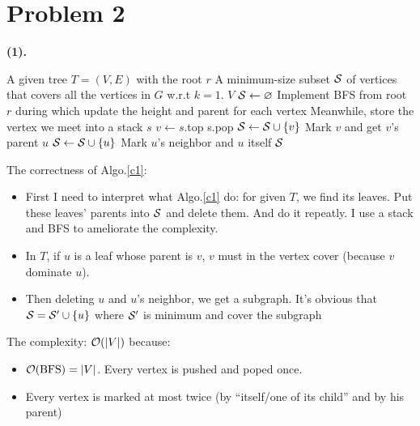 \documentclass{article}
\begin{document}
\section*{Problem 2}
\textbf{(1).}
\begin{algorithm}[H]
	\caption{$\+M(T)$}
	\label{c1}
	\begin{algorithmic}[1]
		\renewcommand{\algorithmicrequire}{\textbf{Input:}}
		\renewcommand{\algorithmicensure}{\textbf{Output:}}
		\renewcommand{\algorithmiccomment}[1]{\hfill\textit{\textcolor{blue}{\##1}}}
		\REQUIRE A given tree $T=(V,E)$ with the root $r$
		\ENSURE A minimum-size subset $\mathcal{S}$ of vertices that covers all the vertices in $G$ w.r.t $k=1$.
		\RETURN $V$
		\ENDIF
		\STATE $\mathcal{S}\gets \varnothing$
		\STATE Implement BFS from root $r$ during which update the height and parent for each vertex
		\STATE Meanwhile, store the vertex we meet into a stack $s$
		\STATE $v\gets s$.top
		\STATE s.pop
		\STATE  $\mathcal{S}\gets\mathcal{S}\cup\{v\}$
		\ENDIF
		\ELSE
		\STATE Mark $v$ and get $v$'s parent $u$
		\STATE $\mathcal{S}\gets\mathcal{S}\cup\{u\}$
		\STATE Mark $u$'s neighbor and $u$ itself
		\ENDIF
		\ENDWHILE
		\RETURN $\mathcal{S}$
	\end{algorithmic} 
\end{algorithm}
\newpage
The correctness of Algo.\ref{c1}:
\begin{itemize}
	\item 
		First I need to interpret what Algo.\ref{c1} do: for given $T$, we find its leaves. Put these leaves' parents into $\mathcal{S}$ and delete them. And do it repeatly. I use a stack and BFS to ameliorate the complexity.
	\item
		In $T$, if $u$ is a leaf whose parent is $v$, $v$ must in the vertex cover (because $v$ dominate $u$).
	\item
		Then deleting $u$ and $u$'s neighbor, we get a subgraph. It's obvious that $\mathcal{S}=\mathcal{S}'\cup\{u\}$ where $\mathcal{S}'$ is minimum and cover the subgraph
\end{itemize}
The complexity: $\mathcal{O}(\qty|V|)$ because:
\begin{itemize}
	\item 
		$\mathcal{O}(\mathrm{BFS})=\qty|V|$. Every vertex is pushed and poped once.
	\item
		Every vertex is marked at most twice (by ``itself/one of its child'' and by his parent)
\end{itemize}
\end{document}
